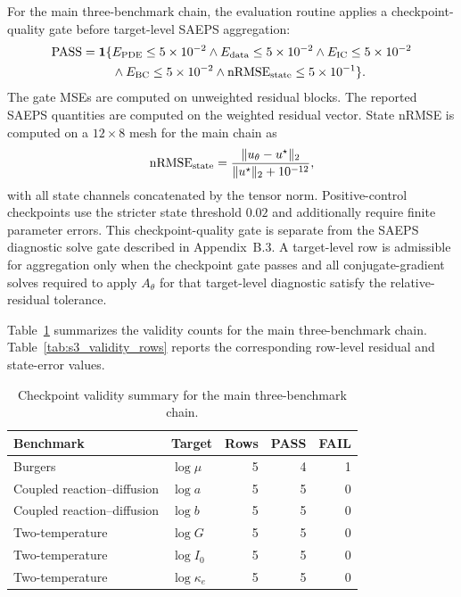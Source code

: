 \documentclass[preprint,12pt]{elsarticle}
\begin{document}
For the main three-benchmark chain, the evaluation routine applies a checkpoint-quality gate before target-level SAEPS aggregation:
\begin{equation}
\begin{aligned}
\mathrm{PASS}=\mathbf{1}
\{&E_{\rm PDE}\le 5\times10^{-2}
\land E_{\rm data}\le 5\times10^{-2}
\land E_{\rm IC}\le 5\times10^{-2}\\
&\land E_{\rm BC}\le 5\times10^{-2}
\land \mathrm{nRMSE}_{\rm state}\le 5\times10^{-1}\}.
\end{aligned}
\end{equation}
The gate MSEs are computed on unweighted residual blocks.  The reported SAEPS quantities are computed on the weighted residual vector.  State nRMSE is computed on a $12\times8$ mesh for the main chain as
\begin{equation}
    \mathrm{nRMSE}_{\rm state}=\frac{\|u_\theta-u^\star\|_2}{\|u^\star\|_2+10^{-12}},
\end{equation}
with all state channels concatenated by the tensor norm.  Positive-control checkpoints use the stricter state threshold $0.02$ and additionally require finite parameter errors.  This checkpoint-quality gate is separate from the SAEPS diagnostic solve gate described in Appendix~B.3.  A target-level row is admissible for aggregation only when the checkpoint gate passes and all conjugate-gradient solves required to apply $A_\theta$ for that target-level diagnostic satisfy the relative-residual tolerance.

Table~\ref{tab:s2_validity_summary} summarizes the validity counts for the main three-benchmark chain.  Table~\ref{tab:s3_validity_rows} reports the corresponding row-level residual and state-error values.

\begin{table}[H]
\centering
\caption{Checkpoint validity summary for the main three-benchmark chain.}
\label{tab:s2_validity_summary}
\begin{tabular}{llrrr}
\toprule
Benchmark & Target & Rows & PASS & FAIL \\
\midrule
Burgers & $\log\mu$ & 5 & 4 & 1 \\
Coupled reaction--diffusion & $\log a$ & 5 & 5 & 0 \\
Coupled reaction--diffusion & $\log b$ & 5 & 5 & 0 \\
Two-temperature & $\log G$ & 5 & 5 & 0 \\
Two-temperature & $\log I_0$ & 5 & 5 & 0 \\
Two-temperature & $\log\kappa_e$ & 5 & 5 & 0 \\
\bottomrule
\end{tabular}
\end{table}
\end{document}
